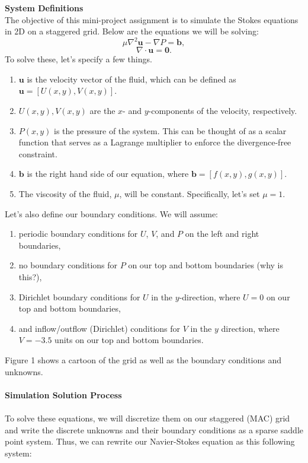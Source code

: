 \documentclass[answers,12pt]{exam}
\begin{document}
 
\textbf{System Definitions} \\
The objective of this mini-project assignment is to simulate the Stokes equations in 2D on a staggered grid. Below are the equations we will be solving:
\begin{equation}
    \mu \nabla^2\textbf{u} - \nabla P = \textbf{b},
\end{equation}
\begin{equation}
    \nabla \cdot \textbf{u} = \textbf{0}.
\end{equation}
To solve these, let's specify a few things.
\begin{enumerate}
    \item $\textbf{u}$ is the velocity vector of the fluid, which can be defined as $\textbf{u} = [U(x,y), V(x,y)]$.
    \item $U(x,y), V(x,y)$ are the $x$- and $y$-components of the velocity, respectively.
    \item $P(x,y)$ is the pressure of the system. This can be thought of as a scalar function that serves as a Lagrange multiplier to enforce the divergence-free constraint.
    \item $\textbf{b}$ is the right hand side of our equation, where $\textbf{b} = [f(x,y), g(x,y)]$.
    \item The viscosity of the fluid, $\mu$, will be constant. Specifically, let's set $\mu = 1$.
\end{enumerate}
Let's also define our boundary conditions. We will assume:
\begin{enumerate}
    \item periodic boundary conditions for $U$, $V$, and $P$ on the left and right boundaries,
    \item no boundary conditions for $P$ on our top and bottom boundaries (why is this?),
    \item Dirichlet boundary conditions for $U$ in the $y$-direction, where $U=0$ on our top and bottom boundaries,
    \item and inflow/outflow (Dirichlet) conditions for $V$ in the $y$ direction, where $V = -3.5$ units on our top and bottom boundaries.
\end{enumerate}
Figure 1 shows a cartoon of the grid as well as the boundary conditions and unknowns. \\\\
\textbf{Simulation Solution Process}\\\\
To solve these equations, we will discretize them on our staggered (MAC) grid and write the discrete unknowns and their boundary conditions as a sparse saddle point system. Thus, we can rewrite our Navier-Stokes equation as this following system:\\
\end{document}
